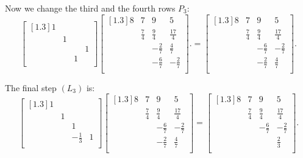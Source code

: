Now we change the third and the fourth rows $P_3$: 
\[
    \begin{bmatrix}[1.3] 
        1 &  &  &   \\
         & 1 &  &   \\
         &  &  &  1 \\
         &  & 1 &   \\
    \end{bmatrix}
    \begin{bmatrix}[1.3] 
        8 & 7 & 9 &  5 \\
         & \frac{7}{4} & \frac{9}{4} &  \frac{17}{4} \\
         &  & -\frac{2}{7} &  \frac{4}{7} \\
         &  & -\frac{6}{7} &  -\frac{2}{7} \\
    \end{bmatrix}. 
    = 
    \begin{bmatrix}[1.3] 
        8 & 7 & 9 &  5 \\
         & \frac{7}{4} & \frac{9}{4} &  \frac{17}{4} \\
         &  & -\frac{6}{7} & -\frac{2}{7}   \\
         &  &-\frac{2}{7}  & \frac{4}{7}   \\
    \end{bmatrix}  . 
\]

The final step $(L_3)$ is: 
\[
    \begin{bmatrix}[1.3] 
       1  &  &  &   \\
         & 1 &  &   \\
         &  & 1&   \\
         &  & -\frac{1}{3} &1   \\
    \end{bmatrix}  
    \begin{bmatrix}[1.3] 
        8 & 7 & 9 &  5 \\
         & \frac{7}{4} & \frac{9}{4} &  \frac{17}{4} \\
         &  & -\frac{6}{7} & -\frac{2}{7}   \\
         &  &-\frac{2}{7}  & \frac{4}{7}   \\
    \end{bmatrix}  
    = 
    \begin{bmatrix}[1.3] 
        8 & 7 & 9 &  5 \\
         & \frac{7}{4} & \frac{9}{4} &  \frac{17}{4} \\
         &  & -\frac{6}{7} &  -\frac{2}{7} \\
         &  &  &  \frac{2}{3} \\
    \end{bmatrix}.  
\]

